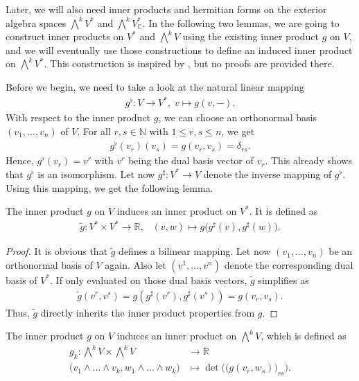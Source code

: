 Later, we will also need inner products and hermitian forms on the exterior algebra spaces
$\bigwedge^kV^*$ and $\bigwedge^k V^*_\mathbb{C}$. In the following two lemmas, we are going 
to construct inner products on $V^*$ and  $\bigwedge^kV$ using the existing inner product $g$ on $V$, 
and we will eventually use those constructions to define an induced inner product on
$\bigwedge\nolimits^kV^*$. This construction is inspired by \cite[Section 11]{Schnell2012}, but no
proofs are provided there.

Before we begin, we need to take a look at the natural linear mapping
\begin{align*}
	g^\flat: V \rightarrow V^*, \;v\mapsto g(v,-).
\end{align*}
With respect to the inner product $g$, we can choose an orthonormal basis $(v_1,\dots,v_n)$ of $V$.
For all $r,s \in \mathbb{N}$ with $1 \leq r,s \leq n$, we get
\begin{align*}
	g^\flat(v_r)(v_s) = g(v_r,v_s) = \delta_{rs}.
\end{align*}
Hence, $g^\flat(v_r) = v^r$ with $v^r$ being the dual basis vector of $v_r$. This already shows that
$g^\flat$ is an isomorphism. Let now $g^\sharp: V^* \rightarrow V$ denote the inverse mapping of
$g^\flat$. Using this mapping, we get the following lemma.
\begin{lm}
	\label{loc-theory:lm:product-on-dual-space}
	The inner product $g$ on $V$ induces an inner product on $V^*$. It is defined \nolinebreak as 
	\begin{align*}
		\tilde{g}: V^* \times V^* \rightarrow \mathbb{R},\; \enspace
		(v,w) \mapsto g\big(g^\sharp(v),g^\sharp(w)\big).
	\end{align*}
\end{lm}
\begin{proof}
	It is obvious that $\tilde{g}$ defines a bilinear mapping. Let now $(v_1,\dots,v_n)$ be an
	orthonormal basis of $V$ again. Also let $(v^1,\dots,v^n)$ denote the corresponding dual basis of
	$V^*$. If only evaluated on those dual basis vectors, $\tilde g$ simplifies as
	\begin{align*}
		\tilde{g}(v^r,v^s) = g(g^\sharp(v^r), g^\sharp(v^s)) = g(v_r,v_s).
	\end{align*}
	Thus, $\tilde{g}$ directly inherits the inner product properties from \nolinebreak$g$.
\end{proof}
\begin{lm}
	\label{loc-theory:lm:product-on-exterior-algebra}
	The inner product $g$ on $V$ induces an inner product on $\bigwedge\nolimits^kV$, which is defined as
	\begin{align*}
		g_k: \bigwedge\nolimits^kV \times \bigwedge\nolimits^kV &\rightarrow \mathbb R\\
		\big(v_1 \wedge \dots \wedge v_k, w_1\wedge\dots \wedge w_k\big) &\mapsto
		\det\Big(\big(g(v_r,w_s)\big)_{rs}\Big).
	\end{align*}
\end{lm}
